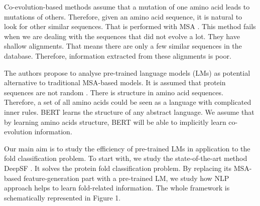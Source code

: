 \documentclass[12pt, twoside]{article}
\begin{document}
 Co-evolution-based methods assume \cite{co-evolution} that a mutation of one amino acid leads to mutations of others. Therefore, given an amino acid sequence, it is natural to look for other similar sequences. That is performed with MSA \cite{co-evolution}. This method fails when we are dealing with the sequences that did not evolve a lot. They have shallow alignments. That means there are only a few similar sequences in the database. Therefore, information extracted from these alignments is poor. 

The authors propose to analyse pre-trained language models (LMs)  \cite{Elnaggar} as potential alternative to traditional MSA-based models. It is assumed that protein sequences are not random \cite{evolution-not-random}. There is structure in amino acid sequences. Therefore, a set of all amino acids could be seen as a language with complicated inner rules. BERT \cite{bert} learns the structure of any abstract language. We assume that by learning amino acids structure, BERT will be able to implicitly learn co-evolution information.

Our main aim is to study the efficiency of pre-trained LMs in application to the fold classification problem.  To start with, we study the state-of-the-art method DeepSF \cite{DeepSF}. It solves the protein fold classification problem.  By replacing its MSA-based feature-generation part with a pre-trained LM, we study how NLP approach helps to learn fold-related information.  The whole framework is schematically represented in Figure 1. 

\end{document}
